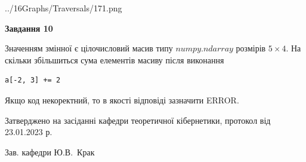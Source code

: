 \documentclass[12pt, ukrainian]{article}
\begin{document}
{\begin {large}
\begin{center}
	{../16Graphs/Traversals/171.png}
\end{center}\par
\newpage

{\begin {center}\textbf{Завдання 10}\end {center}}\par
Значенням змінної  є цілочисловий масив типу $numpy.ndarray$ розмірів $5{\times}4$. На скільки збільшиться сума елементів масиву  після виконання
\begin{verbatim}
a[-2, 3] += 2
\end{verbatim}


Якщо код некоректний, то в якості відповіді зазначити ERROR.\par
\newpage


\end {large}
}
{\smallskip \begin {small} Затверджено на засіданні кафедри теоретичної кібернетики, протокол  від   23.01.2023 р.\par\smallskip\smallskip
{\parbox {6.5 cm}{Зав. кафедри \dotfill Ю.В.~Крак}} \end{small}}
\end{document}

